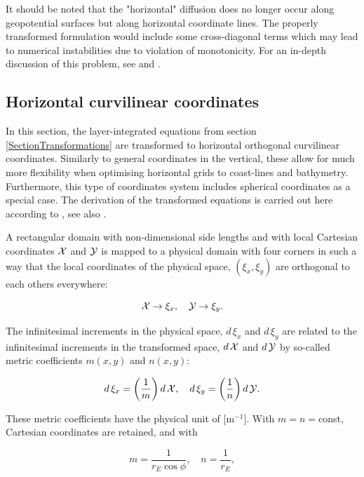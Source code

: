 It should be noted that the "horizontal" diffusion does no longer occur 
along geopotential surfaces but along horizontal coordinate lines.
The properly transformed formulation would include some cross-diagonal
terms which may lead to numerical instabilities due to violation
of monotonicity. For an in-depth discussion of this
problem, see \cite{BECKERSea98} and \cite{BECKERSea00}.   


\subsection{Horizontal curvilinear coordinates}\label{SectionCurviCoords} 

In this section, the layer-integrated equations from
section \ref{SectionTransformations} 
are transformed to horizontal orthogonal curvilinear 
coordinates. Similarly to general coordinates in the vertical,
these allow for much more flexibility when optimising 
horizontal grids to coast-lines and bathymetry. 
Furthermore, this type of coordinates system includes 
spherical coordinates as a special case. 
The derivation of the transformed equations is carried out here
according to \cite{HAIDVOGELea99}, see also \cite{ARAKAWAea77}. 

A rectangular domain with non-dimensional side lengths  
and with local Cartesian coordinates ${\cal X}$ and ${\cal Y}$
is mapped to a physical domain with four corners in such a way
that the local coordinates of the physical space,
$(\xi_x,\xi_y)$ are orthogonal to each others everywhere:

\begin{equation}\label{calXYdef} 
{\cal X} \rightarrow \xi_x,\quad {\cal Y} \rightarrow \xi_y. 
\end{equation}

The infinitesimal increments in the physical space,
$d\,\xi_x$ and $d\,\xi_y$ are related to the 
infinitesimal increments in the transformed space,
$d\,{\cal X}$ and $d\,{\cal Y}$ by so-called metric 
coefficients $m(x,y)$ and $n(x,y)$:

\begin{equation}\label{curvidef} 
d\,\xi_x = \left(\frac{1}{m} \right) d\,{\cal X}, \quad
d\,\xi_y = \left(\frac{1}{n} \right) d\,{\cal Y}. 
\end{equation}

These metric coefficients have the physical unit of [m$^{-1}$].  
With $m=n=$const, Cartesian coordinates are retained, and with

\begin{equation}\label{rE} 
m=\frac{1}{r_E\cos\phi},\quad n=\frac{1}{r_E},
\end{equation}

